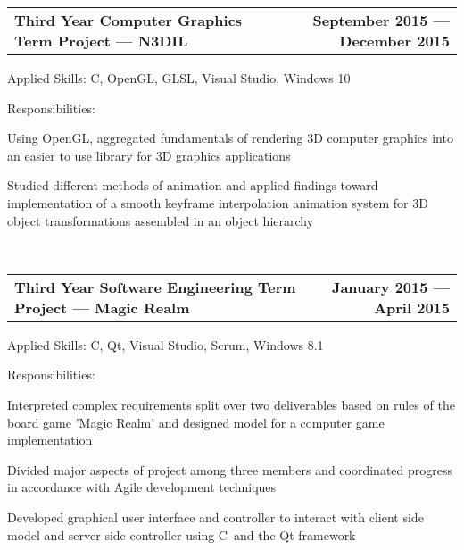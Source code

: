 \documentclass[10pt,letterpaper]{article}
\makeatletter
\newenvironment{indentsection}[1]%
{\begin{list}{}%
  {\setlength{\leftmargin}{#1}}%
  \item[]%
}
{\end{list}}
\newcommand{\headerrow}[2]
{\begin{tabular*}{\linewidth}{l@{\extracolsep{\fill}}r}
  #1 &
  #2 \\
\end{tabular*}}
\newcommand{\CPP}
{C\nolinebreak[4]\hspace{-.05em}\raisebox{.22ex}{\footnotesize\bf ++}}
\makeatother
\begin{document}
\begin{itemize}
  \item
  \headerrow
    {\textbf{Third Year Computer Graphics Term Project — N3DIL}}
    {\textbf{September 2015 — December 2015}}
  \begin{indentsection}{1em}
    \begin{description*}
      \item[Applied Skills:]
      \CPP, OpenGL, GLSL, Visual Studio, Windows 10
      \item[Responsibilities:]
      \hfill
      \begin{itemize*}
        \item Using OpenGL, aggregated fundamentals of rendering 3D computer
        graphics into an easier to use library for 3D graphics applications
        \item Studied different methods of animation and applied findings toward
        implementation of a smooth keyframe interpolation animation system for 3D
        object transformations assembled in an object hierarchy
      \end{itemize*}
    \end{description*}
  \end{indentsection}

  \ %

  \item
  \headerrow
    {\textbf{Third Year Software Engineering Term Project — Magic Realm}}
    {\textbf{January 2015 — April 2015}}
  \begin{indentsection}{1em}
    \begin{description*}
      \item[Applied Skills:]
      \CPP, Qt, Visual Studio, Scrum, Windows 8.1
      \item[Responsibilities:]
      \hfill
      \begin{itemize*}
        \item Interpreted complex requirements split over two deliverables based
        on rules of the board game 'Magic Realm' and designed model for a computer
        game implementation
        \item Divided major aspects of project among three members and coordinated
        progress in accordance with Agile development techniques
        \item Developed graphical user interface and controller to interact with
        client side model and server side controller using \CPP\ and the Qt
        framework
      \end{itemize*}
    \end{description*}
  \end{indentsection}


\end{itemize}
\end{document}
